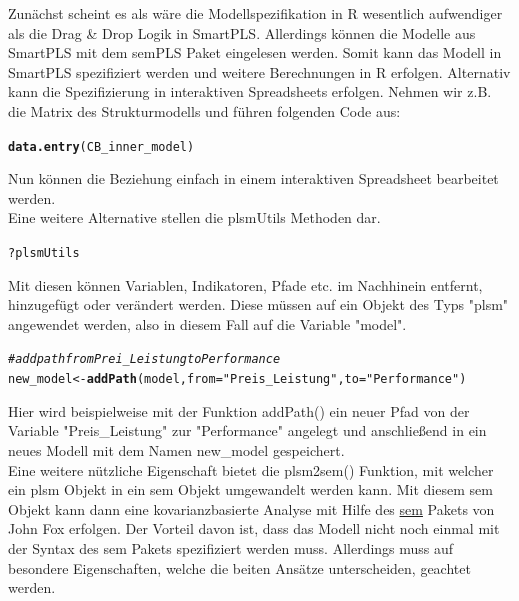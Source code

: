 \documentclass{article}\usepackage[]{graphicx}\usepackage[]{color}
\makeatletter
\newcommand{\hlstr}[1]{\textcolor[rgb]{0.192,0.494,0.8}{#1}}%
\newcommand{\hlcom}[1]{\textcolor[rgb]{0.678,0.584,0.686}{\textit{#1}}}%
\newcommand{\hlopt}[1]{\textcolor[rgb]{0,0,0}{#1}}%
\newcommand{\hlstd}[1]{\textcolor[rgb]{0.345,0.345,0.345}{#1}}%
\newcommand{\hlkwb}[1]{\textcolor[rgb]{0.69,0.353,0.396}{#1}}%
\newcommand{\hlkwc}[1]{\textcolor[rgb]{0.333,0.667,0.333}{#1}}%
\newcommand{\hlkwd}[1]{\textcolor[rgb]{0.737,0.353,0.396}{\textbf{#1}}}%
\newenvironment{kframe}{%
 \def\at@end@of@kframe{}%
 \ifinner\ifhmode%
  \def\at@end@of@kframe{\end{minipage}}%
  \begin{minipage}{\columnwidth}%
 \fi\fi%
 \def\FrameCommand##1{\hskip\@totalleftmargin \hskip-\fboxsep
 \colorbox{shadecolor}{##1}\hskip-\fboxsep
     \hskip-\linewidth \hskip-\@totalleftmargin \hskip\columnwidth}%
 \MakeFramed {\advance\hsize-\width
   \@totalleftmargin\z@ \linewidth\hsize
   \@setminipage}}%
 {\par\unskip\endMakeFramed%
 \at@end@of@kframe}
\newenvironment{knitrout}{}{} %
\makeatother
\begin{document}
Zunächst scheint es als wäre die Modellspezifikation in R wesentlich aufwendiger als die Drag \& Drop Logik in SmartPLS. Allerdings können die Modelle aus SmartPLS mit dem semPLS Paket eingelesen werden. Somit kann das Modell in SmartPLS spezifiziert werden und weitere Berechnungen in R erfolgen. Alternativ kann die Spezifizierung in interaktiven Spreadsheets erfolgen. Nehmen wir z.B. die Matrix des Strukturmodells und führen folgenden Code aus:
\begin{knitrout}
\color{fgcolor}\begin{kframe}
\begin{alltt}
\hlkwd{data.entry}\hlstd{(CB_inner_model)}
\end{alltt}
\end{kframe}
\end{knitrout}
Nun können die Beziehung einfach in einem interaktiven Spreadsheet bearbeitet werden.\\
Eine weitere Alternative stellen die plsmUtils Methoden dar.
\begin{knitrout}
\color{fgcolor}\begin{kframe}
\begin{alltt}
\hlopt{?}\hlstd{plsmUtils}
\end{alltt}
\end{kframe}
\end{knitrout}
Mit diesen können Variablen, Indikatoren, Pfade etc. im Nachhinein entfernt, hinzugefügt oder verändert werden. Diese müssen auf ein Objekt des Typs "plsm" angewendet werden, also in diesem Fall auf die Variable "model".
\begin{knitrout}
\color{fgcolor}\begin{kframe}
\begin{alltt}
\hlcom{#add path from Prei_Leistung to Performance}
\hlstd{new_model} \hlkwb{<-} \hlkwd{addPath}\hlstd{(model,} \hlkwc{from}\hlstd{=}\hlstr{"Preis_Leistung"}\hlstd{,} \hlkwc{to}\hlstd{=}\hlstr{"Performance"}\hlstd{)}
\end{alltt}
\end{kframe}
\end{knitrout}
Hier wird beispielweise mit der Funktion addPath() ein neuer Pfad von der Variable "Preis\_Leistung" zur "Performance" angelegt und anschließend in ein neues Modell mit dem Namen new\_model gespeichert.\\
Eine weitere nützliche Eigenschaft bietet die plsm2sem() Funktion, mit welcher ein plsm Objekt in ein sem Objekt umgewandelt werden kann. Mit diesem sem Objekt kann dann eine kovarianzbasierte Analyse mit Hilfe des \href{http://cran.r-project.org/web/packages/sem/index.html}{sem} Pakets von John Fox erfolgen. Der Vorteil davon ist, dass das Modell nicht noch einmal mit der Syntax des sem Pakets spezifiziert werden muss. Allerdings muss auf besondere Eigenschaften, welche die beiten Ansätze unterscheiden, geachtet werden.
\end{document}
